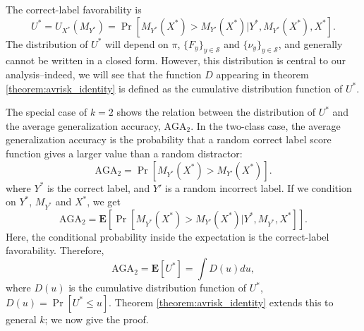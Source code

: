 \documentclass[twoside,11pt]{article}
\newcommand{\E}{\textbf{E}}
\begin{document}
The correct-label favorability is
\begin{equation}
U^* = U_{X^*}(M_{Y^*}) = \Pr[M_{Y^*}(X^*) > M_{Y'}(X^*)|Y^*,M_{Y^*}(X^*),X^*].
\end{equation}
The distribution of $U^*$ will depend on $\pi$, $\{F_y\}_{y \in \mathcal{S}}$ and $\{\nu_y\}_{y \in \mathcal{S}}$, and
generally cannot be written in a closed form.  However, this
distribution is central to our analysis--indeed, we will see that the
function ${D}$ appearing in theorem \ref{theorem:avrisk_identity}
is defined as the cumulative distribution function of $U^*$.

The special case of $k=2$ shows the relation between the distribution
of $U^*$ and the average generalization accuracy, $\text{AGA}_2$. In
the two-class case, the average generalization accuracy is the
probability that a random correct label score function gives a larger
value than a random distractor:
\[
\text{AGA}_2 = \Pr[M_{Y^*}(X^*) > M_{Y'}(X^*)].
\]
where $Y^*$ is the correct label, and $Y'$ is a random incorrect
label.  If we condition on $Y^*$, $M_{Y^*}$ and $X^*$, we get
\[
\text{AGA}_2 = \E[\Pr[M_{Y^*}(X^*) > M_{Y'}(X^*)|Y^*, M_{Y^*}, X^*]].
\]
Here, the conditional probability inside the expectation is the
correct-label favorability.  Therefore,
\[
\text{AGA}_2 = \E[U^*] = \int {D}(u) du,
\]
where ${D}(u)$ is the cumulative distribution function of $U^*$,
${D}(u) = \Pr[U^* \leq u]$.  Theorem \ref{theorem:avrisk_identity}
extends this to general $k$; we now give the proof.\newline


\end{document}
